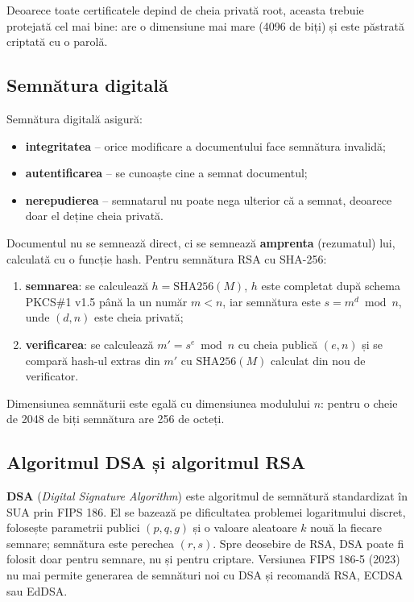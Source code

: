 \documentclass[12pt,a4paper]{article}
\begin{document}
Deoarece toate certificatele depind de cheia privată root, aceasta trebuie
protejată cel mai bine: are o dimensiune mai mare (4096 de biți) și este
păstrată criptată cu o parolă.

\subsection{Semnătura digitală}

Semnătura digitală asigură:
\begin{itemize}
    \item \textbf{integritatea} -- orice modificare a documentului face semnătura
    invalidă;
    \item \textbf{autentificarea} -- se cunoaște cine a semnat documentul;
    \item \textbf{nerepudierea} -- semnatarul nu poate nega ulterior că a semnat,
    deoarece doar el deține cheia privată.
\end{itemize}

Documentul nu se semnează direct, ci se semnează \textbf{amprenta} (rezumatul)
lui, calculată cu o funcție hash. Pentru semnătura RSA cu SHA-256:
\begin{enumerate}
    \item \textbf{semnarea}: se calculează $h = \mathrm{SHA256}(M)$, $h$ este
    completat după schema PKCS\#1 v1.5 până la un număr $m < n$, iar semnătura
    este $s = m^{d} \bmod n$, unde $(d, n)$ este cheia privată;
    \item \textbf{verificarea}: se calculează $m' = s^{e} \bmod n$ cu cheia
    publică $(e, n)$ și se compară hash-ul extras din $m'$ cu
    $\mathrm{SHA256}(M)$ calculat din nou de verificator.
\end{enumerate}
Dimensiunea semnăturii este egală cu dimensiunea modulului $n$: pentru o cheie
de 2048 de biți semnătura are 256 de octeți.

\subsection{Algoritmul DSA și algoritmul RSA}

\textbf{DSA} (\textit{Digital Signature Algorithm}) este algoritmul de semnătură
standardizat în SUA prin FIPS 186. El se bazează pe dificultatea problemei
logaritmului discret, folosește parametrii publici $(p, q, g)$ și o valoare
aleatoare $k$ nouă la fiecare semnare; semnătura este perechea $(r, s)$. Spre
deosebire de RSA, DSA poate fi folosit doar pentru semnare, nu și pentru
criptare. Versiunea FIPS 186-5 (2023) nu mai permite generarea de semnături noi
cu DSA și recomandă RSA, ECDSA sau EdDSA.
\end{document}
